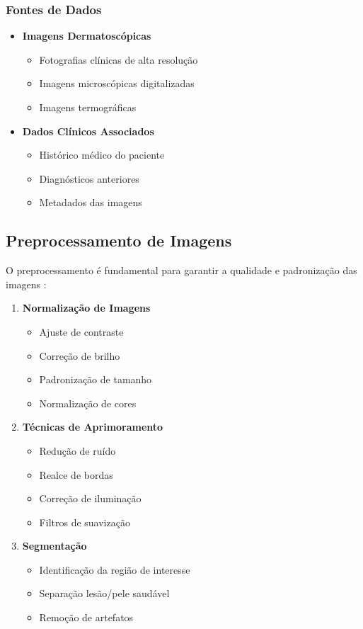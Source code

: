 \subsubsection{Fontes de Dados}
\begin{itemize}
\item \textbf{Imagens Dermatoscópicas}
\begin{itemize}
\item Fotografias clínicas de alta resolução
\item Imagens microscópicas digitalizadas
\item Imagens termográficas
\end{itemize}

\item \textbf{Dados Clínicos Associados}
\begin{itemize}
    \item Histórico médico do paciente
    \item Diagnósticos anteriores
    \item Metadados das imagens
\end{itemize}
\end{itemize}

\subsection{Preprocessamento de Imagens}

O preprocessamento é fundamental para garantir a qualidade e padronização das imagens \cite{smith2023image}:

\begin{enumerate}
\item \textbf{Normalização de Imagens}
\begin{itemize}
\item Ajuste de contraste
\item Correção de brilho
\item Padronização de tamanho
\item Normalização de cores
\end{itemize}

\item \textbf{Técnicas de Aprimoramento}
\begin{itemize}
    \item Redução de ruído
    \item Realce de bordas
    \item Correção de iluminação
    \item Filtros de suavização
\end{itemize}

\item \textbf{Segmentação}
\begin{itemize}
    \item Identificação da região de interesse
    \item Separação lesão/pele saudável
    \item Remoção de artefatos
\end{itemize}
\end{enumerate}

